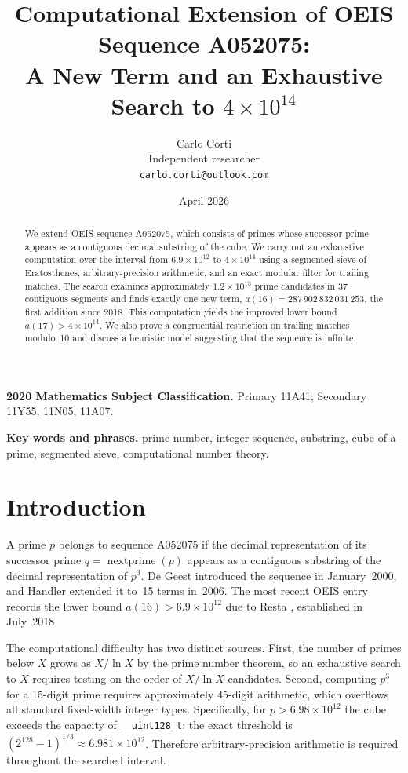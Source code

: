 \documentclass[11pt]{article}
\title{Computational Extension of OEIS Sequence A052075:\\
A New Term and an Exhaustive Search to $4 \times 10^{14}$}
\author{Carlo Corti\\
Independent researcher\\
\texttt{carlo.corti@outlook.com}}
\date{April 2026}
\theoremstyle{definition}
\theoremstyle{remark}
\newcommand{\np}{\operatorname{nextprime}}
\begin{document}
\maketitle

\begin{abstract}
We extend OEIS sequence A052075, which consists of primes whose
successor prime appears as a contiguous decimal substring of the cube.
We carry out an exhaustive computation over the interval from
$6.9 \times 10^{12}$ to $4 \times 10^{14}$ using a segmented sieve of
Eratosthenes, arbitrary-precision arithmetic, and an exact modular
filter for trailing matches.
The search examines approximately $1.2 \times 10^{13}$ prime candidates
in 37 contiguous segments and finds exactly one new term,
$a(16) = 287\,902\,832\,031\,253$, the first addition since 2018.
This computation yields the improved lower bound
$a(17) > 4 \times 10^{14}$.
We also prove a congruential restriction on trailing matches modulo~10
and discuss a heuristic model suggesting that the sequence is infinite.
\end{abstract}

\noindent\textbf{2020 Mathematics Subject Classification.}
Primary 11A41; Secondary 11Y55, 11N05, 11A07.

\noindent\textbf{Key words and phrases.}
prime number, integer sequence, substring, cube of a prime, segmented
sieve, computational number theory.

\section{Introduction}
\label{sec:intro}

A prime $p$ belongs to sequence A052075 if the decimal
representation of its successor prime $q = \np(p)$ appears as a
contiguous substring of the decimal representation of $p^3$.
De Geest \cite{DeGeest2000} introduced the sequence in January~2000,
and Handler \cite{Handler2006} extended it to~15 terms in~2006.
The most recent OEIS entry \cite{OEIS_A052075} records the lower bound
$a(16) > 6.9 \times 10^{12}$ due to Resta \cite{Resta2018},
established in July~2018.

The computational difficulty has two distinct sources.
First, the number of primes below $X$ grows as $X / \ln X$ by the
prime number theorem, so an exhaustive search to $X$ requires testing
on the order of $X / \ln X$ candidates.
Second, computing $p^3$ for a 15-digit prime requires approximately
45-digit arithmetic, which overflows all standard fixed-width integer
types.
Specifically, for $p > 6.98 \times 10^{12}$ the cube exceeds the
capacity of \texttt{\_\_uint128\_t}; the exact threshold is
$(2^{128} - 1)^{1/3} \approx 6.981 \times 10^{12}$.
Therefore arbitrary-precision arithmetic is required throughout
the searched interval.
\end{document}
